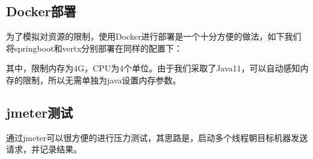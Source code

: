 \documentclass[12pt]{article}
\begin{document}
\subsection{Docker部署}\label{dockerux90e8ux7f72}

为了模拟对资源的限制，使用Docker进行部署是一个十分方便的做法，如下我们将springboot和vertx分别部署在同样的配置下：

\begin{Shaded}
\begin{Highlighting}[]
\KeywordTok{:}\AttributeTok{ }
\KeywordTok{:}
\AttributeTok{  }\KeywordTok{:}
\AttributeTok{    }\KeywordTok{:}
\AttributeTok{      }\KeywordTok{:}
\AttributeTok{      }\KeywordTok{:}
\AttributeTok{    }\KeywordTok{:}
\AttributeTok{    }\KeywordTok{:}
\AttributeTok{      }\KeywordTok{{-}}\AttributeTok{ }
\AttributeTok{    }\KeywordTok{:}
\AttributeTok{    }\KeywordTok{:}\AttributeTok{ }
\AttributeTok{  }\KeywordTok{:}
\AttributeTok{    }\KeywordTok{:}
\AttributeTok{      }\KeywordTok{:}
\AttributeTok{      }\KeywordTok{:}
\AttributeTok{    }\KeywordTok{:}
\AttributeTok{    }\KeywordTok{:}
\AttributeTok{      }\KeywordTok{{-}}\AttributeTok{ }
\AttributeTok{    }\KeywordTok{:}
\AttributeTok{    }\KeywordTok{:}\AttributeTok{ }
\end{Highlighting}
\end{Shaded}

其中，限制内存为4G，CPU为4个单位。由于我们采取了Java11，可以自动感知内存的限制，所以无需单独为java设置内存参数。

\subsection{jmeter测试}\label{jmeterux6d4bux8bd5}

通过jmeter可以很方便的进行压力测试，其思路是，启动多个线程朝目标机器发送请求，并记录结果。
\end{document}
